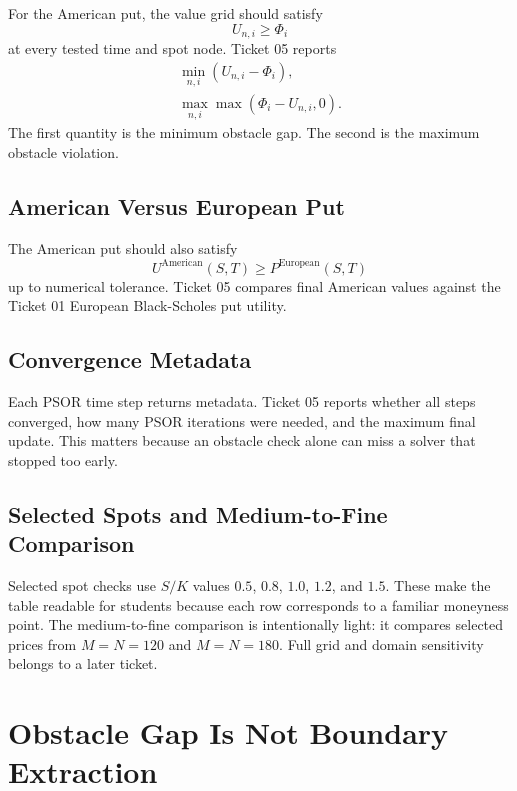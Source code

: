 \documentclass[11pt,a4paper]{article}
\begin{document}
For the American put, the value grid should satisfy
\begin{equation}
  U_{n,i} \geq \Phi_i
\end{equation}
at every tested time and spot node. Ticket 05 reports
\begin{align}
  \min_{n,i}(U_{n,i}-\Phi_i), \\
  \max_{n,i}\max(\Phi_i-U_{n,i},0).
\end{align}
The first quantity is the minimum obstacle gap. The second is the maximum obstacle violation.

\subsection{American Versus European Put}

The American put should also satisfy
\begin{equation}
  U^{\mathrm{American}}(S,T)
  \geq
  P^{\mathrm{European}}(S,T)
\end{equation}
up to numerical tolerance. Ticket 05 compares final American values against the Ticket 01
European Black-Scholes put utility.

\subsection{Convergence Metadata}

Each PSOR time step returns metadata. Ticket 05 reports whether all steps converged, how many
PSOR iterations were needed, and the maximum final update. This matters because an obstacle check
alone can miss a solver that stopped too early.

\subsection{Selected Spots and Medium-to-Fine Comparison}

Selected spot checks use \(S/K\) values \(0.5\), \(0.8\), \(1.0\), \(1.2\), and \(1.5\). These
make the table readable for students because each row corresponds to a familiar moneyness point.
The medium-to-fine comparison is intentionally light: it compares selected prices from
\(M=N=120\) and \(M=N=180\). Full grid and domain sensitivity belongs to a later ticket.

\section{Obstacle Gap Is Not Boundary Extraction}
\end{document}
